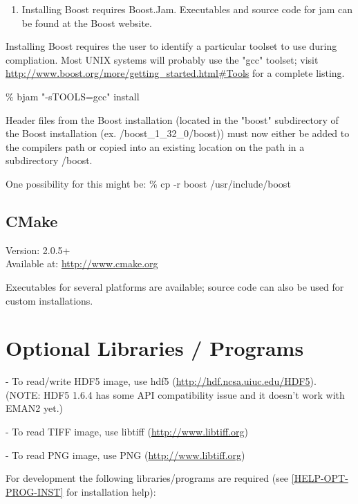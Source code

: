   \begin{enumerate}
    \item
      Installing Boost requires Boost.Jam.  Executables and
      source code for jam can be found at the Boost website.
  \end {enumerate}

  Installing Boost requires the user to identify a particular
  toolset to use during compliation.  Most UNIX systems will
  probably use the "gcc" toolset; visit
  \href{http://www.boost.org/more/getting\_started.html\#Tools}{http://www.boost.org/more/getting\_started.html\#Tools}
  for a complete listing.        

  \% bjam "-sTOOLS=gcc" install 

  Header files from the Boost installation (located in the
  "boost" subdirectory of the Boost installation
  (ex. /boost\_1\_32\_0/boost)) must now either be added to the
  compilers path or copied into an existing location on the path
  in a subdirectory /boost.

  One possibility for this might be:
  \% cp -r boost /usr/include/boost
      
  
\subsection{CMake}
  Version: 2.0.5+\\
  Available at: \href{http://www.cmake.org}{http://www.cmake.org}
    

       Executables for several platforms are available; source code
       can also be used for custom installations.


\section{Optional Libraries / Programs} 
\label{OPTIONAL-LIBRARIES} 

  - To read/write HDF5 image, use hdf5 (\href{http://hdf.ncsa.uiuc.edu/HDF5}{http://hdf.ncsa.uiuc.edu/HDF5}).
	  (NOTE: HDF5 1.6.4 has some API compatibility issue and it doesn't work	        with EMAN2 yet.)
	  
    - To read TIFF image, use libtiff (\href{http://www.libtiff.org}{http://www.libtiff.org})

    - To read PNG image, use PNG (\href{http://www.libpng.org}{http://www.libtiff.org})

    For development the following libraries/programs are required (see
    \ref{HELP-OPT-PROG-INST} for installation help):

